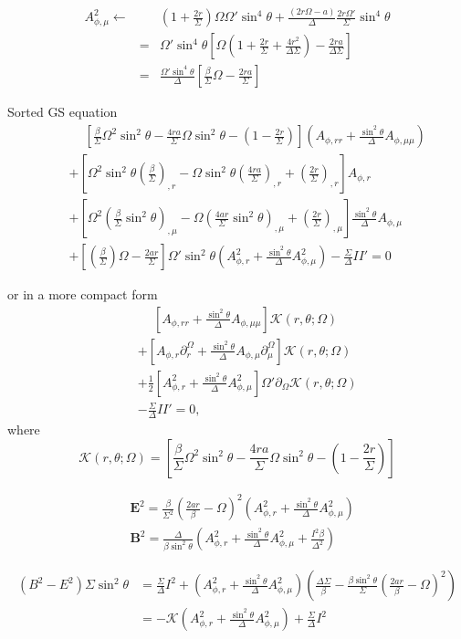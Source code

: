 \documentclass[aps,prd,preprint,groupedaddress]{revtex4-1}
\def\nn{\nonumber}
\def\beq{\begin{equation}}
\def\beqn{\begin{eqnarray}}
\def\eeq{\end{equation}}
\def\eeqn{\end{eqnarray}}
\def\sst{\sin^2\theta}
\def\Ar{A_{\phi,r}}
\def\Arr{A_{\phi,rr}}
\def\Am{A_{\phi,\mu}}
\def\Amm{A_{\phi,\mu\mu}}
\begin{document}
\beqn
\Am^2 \leftarrow
&&
\left(1+\frac{2r}{\Sigma}\right)\Omega\Omega'\sin^4\theta
+\frac{(2r\Omega-a)}{\Delta}\frac{2r\Omega'}{\Sigma}\sin^4\theta \nn \\
&=&
\Omega'\sin^4\theta \left[ \Omega\left(1+\frac{2r}{\Sigma}
+\frac{4r^2}{\Delta\Sigma}\right)-\frac{2ra}{\Delta\Sigma}\right] \nn \\
&=&
\frac{\Omega'\sin^4\theta}{\Delta}\left[ \frac{\beta}{\Sigma}\Omega -\frac{2ra}{\Sigma}\right]
\eeqn

Sorted GS equation
\beqn
&&\phantom{+}
\left[\frac{\beta}{\Sigma}\Omega^2 \sst
-\frac{4ra}{\Sigma}\Omega \sst
-\left(1-\frac{2r}{\Sigma}\right)\right] \left(\Arr + \frac{\sst}{\Delta } \Amm \right)\nn \\
&&
+ \left[  \Omega^2 \sst\left(\frac{\beta}{\Sigma}\right)_{,r}
-\Omega\sst\left(\frac{4ra}{\Sigma}\right)_{,r}
+\left(\frac{2r}{\Sigma}\right)_{,r}\right] \Ar \nn\\
&&
+\left[ \Omega^2\left( \frac{\beta}{\Sigma}\sst \right)_{,\mu}
-\Omega\left(\frac{4ar}{\Sigma}\sst\right)_{,\mu}
+\left(\frac{2r}{\Sigma}\right)_{,\mu}\right]\frac{\sst}{\Delta}\Am \nn \\
&&
+ \left[ \left(\frac{\beta}{\Sigma}\right) \Omega-\frac{2ar}{\Sigma}\right]
\Omega'\sst\left(\Ar^2 + \frac{\sst}{\Delta}\Am^2\right)
- \frac{\Sigma}{\Delta} II' = 0
\eeqn

or in a more compact form
\beqn
&&\phantom{+}
 \left[\Arr + \frac{\sst}{\Delta}\Amm \right]  \mathcal K(r,\theta; \Omega )\nn \\
&&
+\left[\Ar \partial_r^\Omega  +  \frac{\sst}{\Delta}\Am \partial_\mu^\Omega\right] \mathcal K(r,\theta; \Omega ) \nn \\
&&
+ \frac{1}{2}\left[\Ar^2 + \frac{\sst}{\Delta}\Am^2\right]  \Omega' \partial_\Omega \mathcal K(r,\theta; \Omega )\nn \\
&&
- \frac{\Sigma}{\Delta}II' = 0,
\eeqn
where
\beq
\mathcal K(r,\theta; \Omega ) =
\left[\frac{\beta}{\Sigma}\Omega^2 \sst
-\frac{4ra}{\Sigma}\Omega \sst
-\left(1-\frac{2r}{\Sigma}\right)\right]
\eeq

\begin{align}
    &\bm E^2 = \frac{\beta}{\Sigma^2}\left(\frac{2ar}{\beta}-\Omega \right)^2
    \left(\Ar^2 + \frac{\sst}{\Delta}\Am^2\right) \nn \\
    &\bm B^2 = \frac{\Delta}{\beta \sst}\left(\Ar^2 + \frac{\sst}{\Delta}\Am^2 + \frac{I^2\beta}{\Delta^2} \right)
\end{align}

\begin{align}
    (B^2-E^2)\Sigma\sst
    &= \frac{\Sigma}{\Delta}I^2 + \left(\Ar^2 + \frac{\sst}{\Delta}\Am^2\right)\left(\frac{\Delta\Sigma}{\beta}
    -\frac{\beta\sst}{\Sigma}\left(\frac{2ar}{\beta}-\Omega \right)^2\right) \nn \\
    &= -\mathcal K \left(\Ar^2 + \frac{\sst}{\Delta}\Am^2 \right) + \frac{\Sigma}{\Delta}I^2
\end{align}
\end{document}
